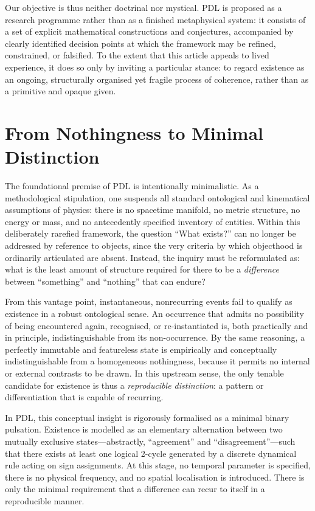\documentclass{article}
\theoremstyle{definition}
\newcommand{\PDL}{\ensuremath{\mathrm{PDL}}}
\begin{document}
Our objective is thus neither doctrinal nor mystical.  
\PDL{} is proposed as a research programme rather than as a finished metaphysical system: it consists of a set of explicit mathematical constructions and conjectures, accompanied by clearly identified decision points at which the framework may be refined, constrained, or falsified.%
\cite{PDL_Position_2026,PDL_Global_Mapping_2026_v3}
To the extent that this article appeals to lived experience, it does so only by inviting a particular stance: to regard existence as an ongoing, structurally organised yet fragile process of coherence, rather than as a primitive and opaque given.

\section{From Nothingness to Minimal Distinction}
\label{sec:nothingness}

The foundational premise of \PDL{} is intentionally minimalistic.  
As a methodological stipulation, one suspends all standard ontological and kinematical assumptions of physics: there is no spacetime manifold, no metric structure, no energy or mass, and no antecedently specified inventory of entities.%
\cite{PDL_Main_2026,PDL_Intro_2026}
Within this deliberately rarefied framework, the question ``What exists?'' can no longer be addressed by reference to objects, since the very criteria by which objecthood is ordinarily articulated are absent.
Instead, the inquiry must be reformulated as: what is the least amount of structure required for there to be a \emph{difference} between ``something'' and ``nothing'' that can endure?

From this vantage point, instantaneous, nonrecurring events fail to qualify as existence in a robust ontological sense.
An occurrence that admits no possibility of being encountered again, recognised, or re-instantiated is, both practically and in principle, indistinguishable from its non-occurrence.%
\cite{PDL_Main_2026}
By the same reasoning, a perfectly immutable and featureless state is empirically and conceptually indistinguishable from a homogeneous nothingness, because it permits no internal or external contrasts to be drawn.
In this upstream sense, the only tenable candidate for existence is thus a \emph{reproducible distinction}: a pattern or differentiation that is capable of recurring.

In \PDL{}, this conceptual insight is rigorously formalised as a minimal binary pulsation.
Existence is modelled as an elementary alternation between two mutually exclusive states—abstractly, “agreement” and “disagreement”—such that there exists at least one logical 2-cycle generated by a discrete dynamical rule acting on sign assignments.%
\cite{PDL_Main_2026,PDL_Minimal_Closures_2026}
At this stage, no temporal parameter is specified, there is no physical frequency, and no spatial localisation is introduced.
There is only the minimal requirement that a difference can recur to itself in a reproducible manner.
\end{document}
